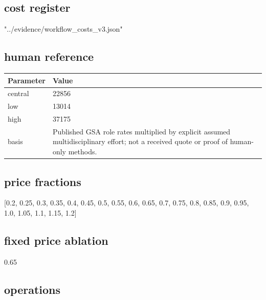 \documentclass[10pt]{article}
\begin{document}
\subsection*{cost register}

"../evidence/workflow\_\allowbreak{}costs\_\allowbreak{}v3.json"

\subsection*{human reference}

\begin{longtable}{p{.44\linewidth}p{.50\linewidth}}\toprule Parameter & Value \\\midrule\endhead

central & 22856\\

low & 13014\\

high & 37175\\

basis & Published GSA role rates multiplied by explicit assumed multidisciplinary effort; not a received quote or proof of human-only methods.\\

\bottomrule\end{longtable}

\subsection*{price fractions}

[0.2, 0.25, 0.3, 0.35, 0.4, 0.45, 0.5, 0.55, 0.6, 0.65, 0.7, 0.75, 0.8, 0.85, 0.9, 0.95, 1.0, 1.05, 1.1, 1.15, 1.2]

\subsection*{fixed price ablation}

0.65

\subsection*{operations}
\end{document}
